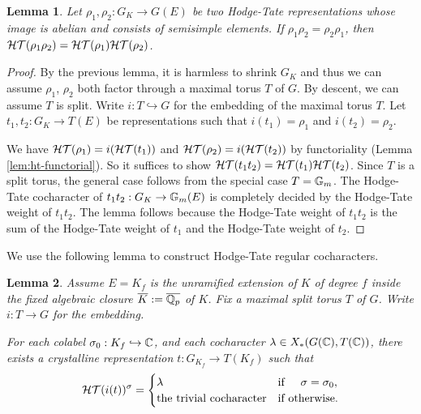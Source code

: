 \documentclass[10pt,a4paper,twoside]{article}
\newtheorem{lem}{Lemma}
\begin{document}
\begin{lem}
Let $\rho_1, \rho_2:G_K \to G(E)$ be two Hodge-Tate representations whose
image is abelian and consists of semisimple elements.
If $\rho_1\rho_2 = \rho_2\rho_1$, then
${\mathcal{HT}}(\rho_1\rho_2) = {\mathcal{HT}}(\rho_1){\mathcal{HT}}(\rho_2)$.
\end{lem}

\begin{proof}
By the previous lemma, it is harmless to shrink $G_K$ and thus we can assume $\rho_1$, $\rho_2$ both factor through a maximal torus
$T$ of $G$. 
By descent, we can assume $T$ is split.
Write $i: T\hookrightarrow G$ for the embedding of the maximal torus $T$.
Let $t_1, t_2:G_K \to T(E)$ be representations such that $i(t_1)=\rho_1$ and $i(t_2)=\rho_2$.

We have ${\mathcal{HT}}(\rho_1) = i({\mathcal{HT}}(t_1))$ and ${\mathcal{HT}}(\rho_2) = i({\mathcal{HT}}(t_2))$ by functoriality (Lemma \ref{lem:ht-functorial}).
So it suffices to show ${\mathcal{HT}}(t_1t_2) = {\mathcal{HT}}(t_1){\mathcal{HT}}(t_2)$.
Since $T$ is a split torus, the general case follows from the special case $T=\mathbb{G}_m$.
The Hodge-Tate cocharacter of $t_1t_2: G_K \to \mathbb{G}_m(E)$
is completely decided by the Hodge-Tate weight of $t_1t_2$. The lemma follows because
the Hodge-Tate weight of $t_1t_2$ is the sum of the Hodge-Tate weight of $t_1$ and the
Hodge-Tate weight of $t_2$.
\end{proof}

We use the following lemma to construct Hodge-Tate regular cocharacters.


\begin{lem}
\label{lem:regular-construction}
Assume $E=K_f$ is the unramified extension of $K$ of degree $f$ inside the fixed algebraic closure $\overline{K}:=\overline{\mathbb{Q}_p}$ of $K$.
Fix a maximal split torus $T$ of $G$.
Write $i:T \to G$ for the embedding.

For each colabel $\sigma_0: K_f \hookrightarrow {\mathbb{C}}$, and each cocharacter
$\lambda\in X_*(G({\mathbb{C}}), T({\mathbb{C}}))$,
there exists a crystalline representation
$t:G_{K_f}\to T(K_f)$ such that
$$
{\mathcal{HT}}(i(t))^{\sigma} = 
\begin{cases}
\lambda & \text{if} \hspace{5mm} \sigma=\sigma_0, \\
\text{the trivial cocharacter} & \text{if otherwise.}
\end{cases}
$$
\end{lem}
\end{document}
